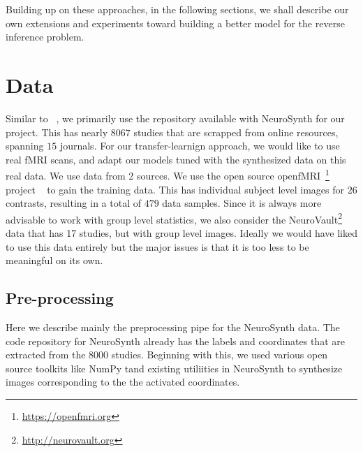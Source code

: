 \documentclass{article} %
\begin{document}
Building up on these approaches,  in the following sections, we shall describe our own extensions and experiments toward building a better model for the reverse inference problem.

\section{Data}
Similar to ~\cite{yarkoni2011large}, we primarily use the repository available with NeuroSynth for our project. This has nearly $8067$ studies that are scrapped from online resources, spanning $15$ journals. For our transfer-learnign approach, we would like to use real fMRI scans, and adapt our models tuned with the synthesized data on this real data. We use data from 2 sources. We use the open source openfMRI~\footnote{\protect \url{https://openfmri.org}} project ~\cite{poldrack2013toward} to gain the training data. This has individual subject level images for $26$ contrasts, resulting in a total of $479$ data samples. Since it is always more advisable to work with group level statistics, we also consider the NeuroVault\footnote{\protect \url{http://neurovault.org}} data that has 17 studies, but with group level images. Ideally we would have liked to use this data entirely but the major issues is that it is too less to be meaningful on its own. 
\subsection{Pre-processing}
\label{sec:preprocess}
Here we describe mainly the preprocessing pipe for the NeuroSynth data. The code repository for NeuroSynth already has the labels and coordinates that are extracted from the $8000$ studies. Beginning with this, we used various open source toolkits like NumPy tand existing utiliities in NeuroSynth to synthesize images corresponding to the the activated coordinates. 
\end{document}
